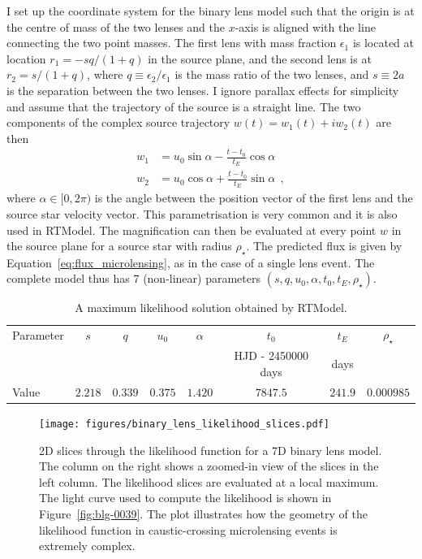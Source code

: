 \documentclass[12pt,dvipsnames]{report}
\newcommand{\hquad}{~~}
\begin{document}
I set up the coordinate system for the binary lens model such that the origin is at 
the centre of mass of the two lenses and the $x$-axis is aligned with the line connecting 
the two point masses.
The first lens with mass fraction $\epsilon_1$ is located at location $r_1=-sq/(1+q)$ 
in the source plane, and the second lens is at $r_2=s/(1+q)$, where 
$q\equiv \epsilon_2/\epsilon_1$ is the mass ratio
of the two lenses, and $s\equiv 2a$ is the separation between the two lenses.
I ignore parallax effects for simplicity and assume that the trajectory of the source 
is a straight line. The two components of the complex source trajectory 
$w(t)=w_1(t) + iw_2(t)$ are then 
\begin{align}
    w_1 &= u_0\sin\alpha - \frac{t-t_0}{t_E}\cos\alpha \\
    w_2 &= u_0\cos\alpha + \frac{t-t_0}{t_E}\sin\alpha
\hquad,
\end{align}
where $\alpha\in[0, 2\pi)$ is the angle between the position vector of the first lens 
and the source star velocity vector. This parametrisation is very common and it is also 
used in RTModel. The magnification can then be evaluated at every point $w$ in the 
source plane for a source star with radius $\rho_\star$. The predicted flux is given by 
Equation~\ref{eq:flux_microlensing}, as in the case of a single lens event. The complete 
model thus has 7 (non-linear) parameters $(s, q, u_0, \alpha, t_0, t_E, \rho_\star)$.

\begin{table}[h!]
\centering
\begin{tabular}{lccccccc}
 \toprule
Parameter & $s$ & $q$ & $u_0$& $\alpha$& $t_0$& $t_E$& $\rho_\star$\\
&&&&&HJD - 2450000 days& days&\\
 \midrule
Value & $2.218$ & $0.339$ & $0.375$ & $1.420$ & $7847.5$ & $241.9$ & $0.000985$\\
\bottomrule
\end{tabular}
\caption{A maximum likelihood solution obtained by RTModel.} 
\label{tab:rtmodel_solution}
\end{table}

\begin{figure}[!t]
    \begin{centering}
        \texttt{[image: figures/binary\_lens\_likelihood\_slices.pdf]}
        \caption{
            2D slices through the likelihood function for a 7D binary lens model. The column  
           on the right shows a zoomed-in view of the slices in the left column.
            The likelihood slices are evaluated at a local maximum. The light curve used to compute 
            the likelihood is shown in Figure~\ref{fig:blg-0039}. The plot illustrates 
            how the geometry of the likelihood function in caustic-crossing microlensing 
            events is extremely complex.
        }
            \label{fig:binary_lens_likelihood_slices}
    \end{centering}
\end{figure}
\end{document}
